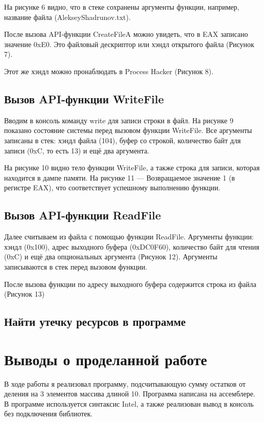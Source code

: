 На рисунке 6 видно, что в стеке сохранены аргументы функции, например, название файла (AlekseyShadrunov.txt). 

После вызова API-функции CreateFileA можно увидеть, что в EAX записано
значение 0xE0. Это файловый дескриптор или хэндл открытого файла (Рисунок 7). 

Этот же хэндл можно пронаблюдать в Process Hacker (Рисунок 8). 
\FloatBarrier



\subsection{Вызов API-функции WriteFile}
Вводим в консоль команду write для записи строки в файл. На рисунке 9 показано состояние системы перед вызовом функции WriteFile. Все аргументы записаны в стек: хэндл файла (104), буфер со строкой, количество байт для записи (0xC, то есть 13) и ещё два аргумента. 

На рисунке 10 видно тело функции WriteFile, а также строка для записи, которая находится в дампе памяти. На рисунке 11 — Возвращаемое значение 1 (в регистре EAX), что соответствует успешному выполнению функции.
\FloatBarrier


\subsection{Вызов API-функции ReadFile}
Далее считываем из файла с помощью функции ReadFile. Аргументы функции: хэндл (0x100), адрес выходного буфера (0xDC0F60), количество байт для чтения (0xC) и ещё два опциональных аргумента (Рисунок 12). Аргументы записываются в стек перед вызовом функции.

После вызова функции по адресу выходного буфера содержится строка из файла (Рисунок 13)
\FloatBarrier


\subsection{Найти утечку ресурсов в программе}


\clearpage






\clearpage



\section{Выводы о проделанной работе}
В ходе работы я реализовал программу, подсчитывающую сумму остатков от деления на 3 элементов массива длиной 10. Программа написана на ассемблере. В программе используется синтаксис Intel, а также реализован вывод в консоль без подключения библиотек.